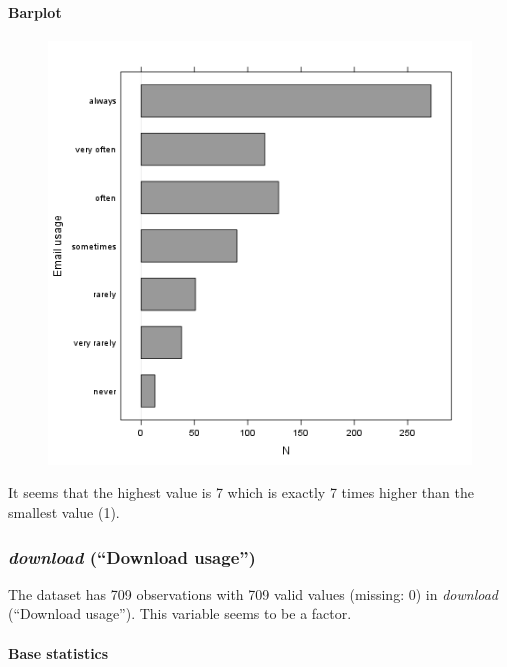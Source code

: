 \documentclass{article}
\makeatletter
\def\maxwidth{\ifdim\Gin@nat@width>\linewidth\linewidth
\else\Gin@nat@width\fi}
\let\Oldincludegraphics\includegraphics
\renewcommand{\includegraphics}[1]{\Oldincludegraphics[width=\maxwidth]{#1}}
\makeatother
\begin{document}
\paragraph{Barplot}

\begin{figure}[htbp]
\centering
\includegraphics{4271956be974e19ffa2034d316fd201c.png}
\caption{}
\end{figure}

It seems that the highest value is 7 which is exactly 7 times higher
than the smallest value (1).

\subsubsection{\emph{download} (``Download usage'')}

The dataset has 709 observations with 709 valid values (missing: 0) in
\emph{download} (``Download usage''). This variable seems to be a
factor.

\paragraph{Base statistics}
\end{document}
